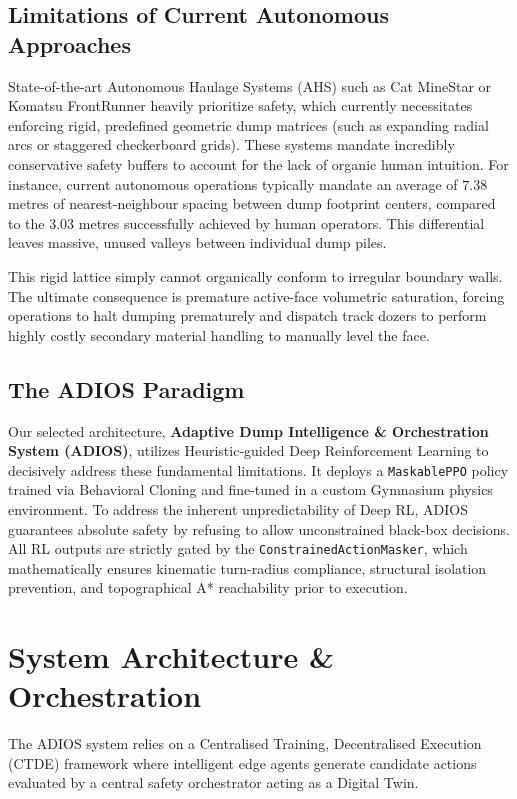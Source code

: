 \documentclass[conference]{IEEEtran}
\begin{document}
\subsection{Limitations of Current Autonomous Approaches}
State-of-the-art Autonomous Haulage Systems (AHS) such as Cat MineStar or Komatsu FrontRunner heavily prioritize safety, which currently necessitates enforcing rigid, predefined geometric dump matrices (such as expanding radial arcs or staggered checkerboard grids). These systems mandate incredibly conservative safety buffers to account for the lack of organic human intuition. For instance, current autonomous operations typically mandate an average of $7.38$ metres of nearest-neighbour spacing between dump footprint centers, compared to the $3.03$ metres successfully achieved by human operators. This differential leaves massive, unused valleys between individual dump piles. 

This rigid lattice simply cannot organically conform to irregular boundary walls. The ultimate consequence is premature active-face volumetric saturation, forcing operations to halt dumping prematurely and dispatch track dozers to perform highly costly secondary material handling to manually level the face.

\subsection{The ADIOS Paradigm}
Our selected architecture, \textbf{Adaptive Dump Intelligence \& Orchestration System (ADIOS)}, utilizes Heuristic-guided Deep Reinforcement Learning to decisively address these fundamental limitations. It deploys a \texttt{MaskablePPO} policy trained via Behavioral Cloning and fine-tuned in a custom Gymnasium physics environment. To address the inherent unpredictability of Deep RL, ADIOS guarantees absolute safety by refusing to allow unconstrained black-box decisions. All RL outputs are strictly gated by the \texttt{ConstrainedActionMasker}, which mathematically ensures kinematic turn-radius compliance, structural isolation prevention, and topographical A* reachability prior to execution.

\section{System Architecture \& Orchestration}

The ADIOS system relies on a Centralised Training, Decentralised Execution (CTDE) framework where intelligent edge agents generate candidate actions evaluated by a central safety orchestrator acting as a Digital Twin.
\end{document}
